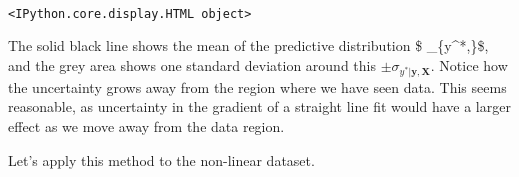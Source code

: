 \documentclass[11pt]{article}
\begin{document}
    \begin{center}
    \end{center}
    { \hspace*{\fill} \\}
    
    
    \begin{verbatim}
<IPython.core.display.HTML object>
    \end{verbatim}

    
    The solid black line shows the mean of the predictive distribution \$
\mu\_\{y\^{}*\textbar{},\}\$, and the grey area
shows one standard deviation around this
\(\pm \sigma_{y^*| \mathbf{y},\mathbf{X}}\). Notice how the uncertainty
grows away from the region where we have seen data. This seems
reasonable, as uncertainty in the gradient of a straight line fit would
have a larger effect as we move away from the data region.

Let's apply this method to the non-linear dataset.
\end{document}
